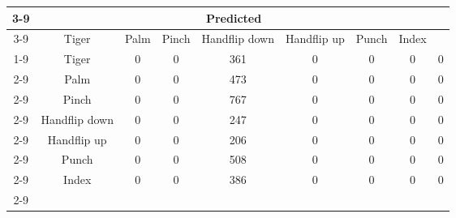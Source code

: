 \documentclass{standalone}
\begin{document}
 
 \begin{tabular}{|c |c |c |c |c |c |c |c |c |}
\cline{3-9}\multicolumn{2}{c|}{} & \multicolumn{7}{c|}{Predicted} \\ 
\cline{3-9} \multicolumn{2}{c |}{ } & Tiger & Palm & Pinch & Handflip down & Handflip up & Punch & Index\\ 
\cline{1-9}\multirow{7}{*}{\rotatebox[origin=c]{90}{Actual}} & Tiger & 0 & 0 & 361 & 0 & 0 & 0 & 0\\ 
 \cline{2-9} & Palm & 0 & 0 & 473 & 0 & 0 & 0 & 0\\ 
 \cline{2-9} & Pinch & 0 & 0 & 767 & 0 & 0 & 0 & 0\\ 
 \cline{2-9} & Handflip down & 0 & 0 & 247 & 0 & 0 & 0 & 0\\ 
 \cline{2-9} & Handflip up & 0 & 0 & 206 & 0 & 0 & 0 & 0\\ 
 \cline{2-9} & Punch & 0 & 0 & 508 & 0 & 0 & 0 & 0\\ 
 \cline{2-9} & Index & 0 & 0 & 386 & 0 & 0 & 0 & 0\\ 
 \cline{2-9}\hline \end{tabular}
 
\end{document}
